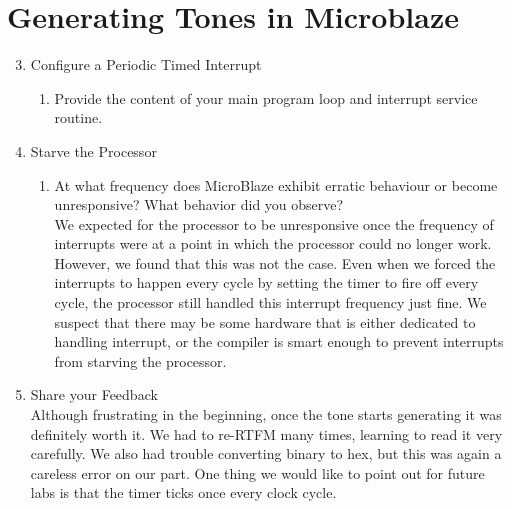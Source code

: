 \documentclass[10pt,titlepage]{article}
\begin{document}
  \section*{Generating Tones in Microblaze}
    \begin{enumerate}
      \setcounter{enumi}{2}
      \item Configure a Periodic Timed Interrupt 
        \begin{enumerate}
          \item Provide the content of your main program loop and interrupt service routine.\\[1em]
          
          
        \end{enumerate}

      \item Starve the Processor
        \begin{enumerate}
          \item At what frequency does MicroBlaze exhibit erratic behaviour or become unresponsive? What behavior did you observe?\\[1em]
            We expected for the processor to be unresponsive once the frequency of interrupts were at a point in which the processor could no longer work. However, we found that this was not the case. Even when we forced the interrupts to happen every cycle by setting the timer to fire off every cycle, the processor still handled this interrupt frequency just fine. We suspect that there may be some hardware that is either dedicated to handling interrupt, or the compiler is smart enough to prevent interrupts from starving the processor.
        \end{enumerate}

      \item Share your Feedback\\[1em]
      Although frustrating in the beginning, once the tone starts generating it was definitely worth it. We had to re-RTFM many times, learning to read it very carefully. We also had trouble converting binary to hex, but this was again a careless error on our part. One thing we would like to point out for future labs is that the timer ticks once every clock cycle. 
    \end{enumerate}
\end{document}
